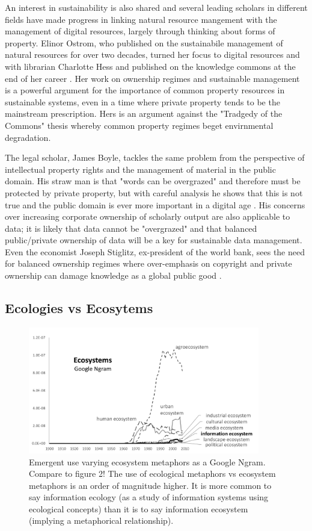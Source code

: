 An interest in sustainability is also shared and several leading scholars in different fields have made progress in linking natural resource mangement with the management of digital resources, largely through thinking about forms of property. Elinor Ostrom, who published on the sustainabile management of natural resources for over two decades, turned her focus to digital resources and with librarian Charlotte Hess and published on the knowledge commons at the end of her career \citep{hess_2006}. Her work on ownership regimes and sustainable management is a powerful argument for the importance of common property resources in sustainable systems, even in a time where private property tends to be the mainstream prescription. Hers is an argument against the "Tradgedy of the Commons" thesis whereby common property regimes beget envirnmental degradation.

The legal scholar, James Boyle, tackles the same problem from the perspective of intellectual property rights and the management of material in the public domain. His straw man is that "words can be overgrazed" and therefore must be protected by private property, but with careful analysis he shows that this is not true and the public domain is ever more important in a digital age \citep[][footnote 15 on p. 5]{boyle_2003}. His concerns over increasing corporate ownership of scholarly output are also applicable to data; it is likely that data cannot be "overgrazed" and that balanced public/private ownership of data will be a key for sustainable data management. Even the economist Joseph Stiglitz, ex-president of the world bank, sees the need for balanced ownership regimes where over-emphasis on copyright and private ownership can damage knowledge as a global public good \citep{stiglitz_1999}.

\subsection{Ecologies vs Ecosytems}



\begin{figure}[!ht]
  \centering
    \includegraphics[width=0.9\textwidth]{figures/ecosystemsAll}
  \caption{Emergent use varying ecosystem metaphors as a Google Ngram. Compare to figure 2! The use of ecological metaphors vs ecosystem metaphors is an order of magnitude higher. It is more common to say information ecology (as a study of information systems using ecological concepts) than it is to say information ecosystem (implying a metaphorical relationship).}
\end{figure}

